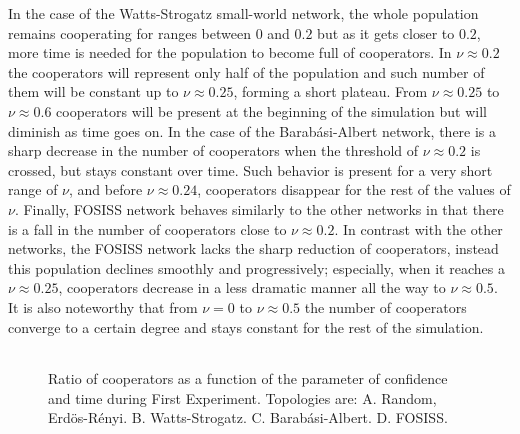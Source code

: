 \documentclass{bmcart}
\def\texttt{[image: ]}
\begin{document}
In the case of the Watts-Strogatz small-world network, the whole
population remains cooperating for ranges between $0$ and $0.2$ but as
it gets closer to $0.2$, more time is needed for the population to
become full of cooperators. In $\nu \approx 0.2$ the cooperators will
represent only half of the population and such number of them will be
constant up to $\nu \approx 0.25$, forming a short plateau. From
$\nu \approx 0.25$ to $\nu \approx 0.6$ cooperators will be present at
the beginning of the simulation but will diminish as time goes on.  In
the case of the Barab\'asi-Albert network, there is a sharp decrease
in the number of cooperators when the threshold of $\nu \approx 0.2$
is crossed, but stays constant over time. Such behavior is present for
a very short range of $\nu$, and before $\nu \approx 0.24$,
cooperators disappear for the rest of the values of $\nu$. Finally, FOSISS
network behaves similarly to the other networks in that there is a
fall in the number of cooperators close to $\nu \approx 0.2$. In
contrast with the other networks, the FOSISS network lacks the sharp
reduction of cooperators, instead this population declines smoothly
and progressively; especially, when it reaches a $\nu \approx 0.25$,
cooperators decrease in a less dramatic manner all the way to
$\nu \approx 0.5$. It is also noteworthy that from $\nu = 0$ to
$\nu \approx 0.5$ the number of cooperators converge to a certain
degree and stays constant for the rest of the simulation.\\


\begin{figure} [h!]
\centering
\begin{tabular}{cc}
\end{tabular}
\caption{Ratio of cooperators as a function of the parameter of confidence and time during First Experiment. Topologies are: A. Random, Erd\"{o}s-R\'enyi. B. Watts-Strogatz. C. Barab\'asi-Albert. D. FOSISS.
}\label{CD}
\end{figure}

\end{document}
